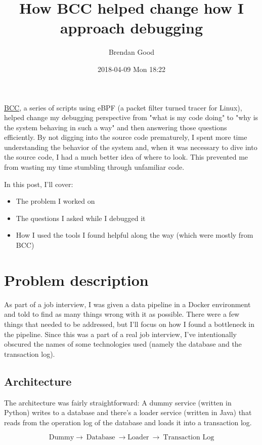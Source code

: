 \documentclass[11pt]{article}
\author{Brendan Good}
\date{2018-04-09 Mon 18:22}
\title{How BCC helped change how I approach debugging}
\begin{document}
\maketitle
\href{https://github.com/iovisor/bcc}{BCC}, a series of scripts using eBPF (a packet filter turned tracer for Linux), helped change my debugging perspective from "what is my code doing" to "why is the system behaving in such a way"
and then answering those questions efficiently. By not digging into the source code prematurely, I spent more time understanding the behavior of the system and, when it was necessary to dive
into the source code, I had a much better idea of where to look. This prevented me from wasting my time stumbling through unfamiliar code.

In this post, I'll cover:
\begin{itemize}
\item The problem I worked on
\item The questions I asked while I debugged it
\item How I used the tools I found helpful along the way (which were mostly from BCC)
\end{itemize}

\section*{Problem description}
\label{sec:org7800d6e}
As part of a job interview, I was given a data pipeline in a Docker environment and told to find as many things wrong with it as possible. There were a few things that needed to be addressed,
but I'll focus on how I found a bottleneck in the pipeline. Since this was a part of a real job interview, I've intentionally obscured the names of some technologies used (namely the database
and the transaction log).

\subsection*{Architecture}
\label{sec:org89ab1db}
The architecture was fairly straightforward: A dummy service (written in Python) writes to a database and there's a loader service (written in Java) that reads from the operation log of the database
and loads it into a transaction log.

\[
\text{Dummy}\to\ \text{Database}\ \to \text{Loader}\ \to\ \text{Transaction Log}
\]
\end{document}
